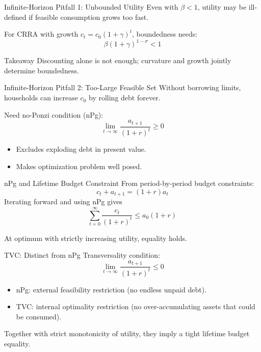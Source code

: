 \documentclass[aspectratio=169,10pt]{beamer}
\newcommand{\apxbutton}[1]{\hfill\hyperlink{#1}{\beamerbutton{Appendix}}}
\begin{document}
\begin{frame}{Infinite-Horizon Pitfall 1: Unbounded Utility}
Even with $\beta<1$, utility may be ill-defined if feasible consumption grows too fast.

For CRRA with growth $c_t=c_0(1+\gamma)^t$, boundedness needs:
\[
\beta(1+\gamma)^{1-\sigma}<1
\]

\begin{block}{Takeaway}
Discounting alone is not enough; curvature and growth jointly determine boundedness.
\end{block}
\end{frame}

\begin{frame}{Infinite-Horizon Pitfall 2: Too-Large Feasible Set}
Without borrowing limits, households can increase $c_0$ by rolling debt forever.

\medskip
Need no-Ponzi condition (nPg):
\[
\lim_{t\to\infty}\frac{a_{t+1}}{(1+r)^t}\ge 0
\]

\begin{itemize}
  \item Excludes exploding debt in present value.
  \item Makes optimization problem well posed.
\end{itemize}
\end{frame}

\begin{frame}{nPg and Lifetime Budget Constraint}
\hypertarget{m-a5}{}
From period-by-period budget constraints:
\[
c_t+a_{t+1}=(1+r)a_t
\]
Iterating forward and using nPg gives
\[
\sum_{t=0}^{\infty}\frac{c_t}{(1+r)^t}\le a_0(1+r)
\]

At optimum with strictly increasing utility, equality holds.
\apxbutton{a5}
\end{frame}

\begin{frame}{TVC: Distinct from nPg}
Transversality condition:
\[
\lim_{t\to\infty}\frac{a_{t+1}}{(1+r)^t}\le 0
\]

\begin{itemize}
  \item nPg: external feasibility restriction (no endless unpaid debt).
  \item TVC: internal optimality restriction (no over-accumulating assets that could be consumed).
\end{itemize}

Together with strict monotonicity of utility, they imply a tight lifetime budget equality.
\end{frame}
\end{document}
